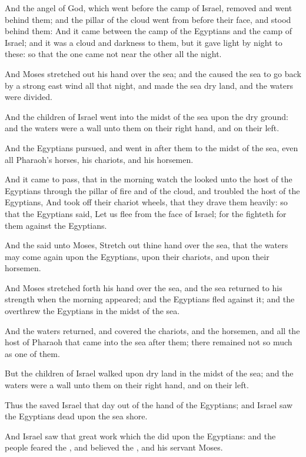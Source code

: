 \verse And the angel of God, which went before the camp of Israel,
removed and went behind them; and the pillar of the cloud went from
before their face, and stood behind them: \verse And it came between
the camp of the Egyptians and the camp of Israel; and it was a cloud
and darkness to them, but it gave light by night to these: so that the
one came not near the other all the night.

\verse And Moses stretched out his hand over the sea; and the \LORD
caused the sea to go back by a strong east wind all that night, and
made the sea dry land, and the waters were divided.

\verse And the children of Israel went into the midst of the sea upon
the dry ground: and the waters were a wall unto them on their right
hand, and on their left.

\verse And the Egyptians pursued, and went in after them to the midst
of the sea, even all Pharaoh's horses, his chariots, and his horsemen.

\verse And it came to pass, that in the morning watch the \LORD looked
unto the host of the Egyptians through the pillar of fire and of the
cloud, and troubled the host of the Egyptians, \verse And took off
their chariot wheels, that they drave them heavily: so that the
Egyptians said, Let us flee from the face of Israel; for the \LORD
fighteth for them against the Egyptians.

\verse And the \LORD said unto Moses, Stretch out thine hand over the
sea, that the waters may come again upon the Egyptians, upon their
chariots, and upon their horsemen.

\verse And Moses stretched forth his hand over the sea, and the sea
returned to his strength when the morning appeared; and the Egyptians
fled against it; and the \LORD overthrew the Egyptians in the midst of
the sea.

\verse And the waters returned, and covered the chariots, and the
horsemen, and all the host of Pharaoh that came into the sea after
them; there remained not so much as one of them.

\verse But the children of Israel walked upon dry land in the midst of
the sea; and the waters were a wall unto them on their right hand, and
on their left.

\verse Thus the \LORD saved Israel that day out of the hand of the
Egyptians; and Israel saw the Egyptians dead upon the sea shore.

\verse And Israel saw that great work which the \LORD did upon the
Egyptians: and the people feared the \LORD, and believed the \LORD, and
his servant Moses.

